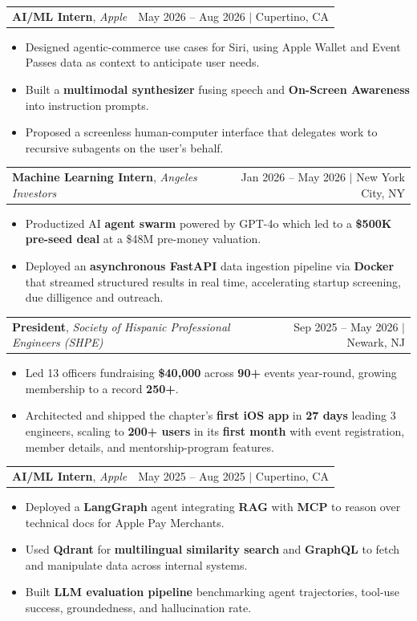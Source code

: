 \documentclass[letterpaper,10pt]{article}
\makeatletter
\newcommand{\resumeItem}[1]{\item\small{{#1}}}
\newcommand{\resumeOneLineHeading}[4]{
  \vspace{1pt}\item
    \begin{tabular*}{0.97\textwidth}[t]{l@{\extracolsep{\fill}}r}
      \textbf{#1}, \textit{#2} & \small #3 $|$ #4 \\
    \end{tabular*}\vspace{-3pt}
}
\newcommand{\resumeItemListStart}{
  \begin{itemize}[leftmargin=0.25in]
}
\newcommand{\resumeItemListEnd}{
  \end{itemize}\vspace{-3pt}
}
\makeatother
\begin{document}
    \resumeOneLineHeading
      {AI/ML Intern}
      {Apple}
      {May 2026 -- Aug 2026}
      {Cupertino, CA}

      \vspace{5pt}

      \resumeItemListStart
      \resumeItem{Designed agentic-commerce use cases for Siri, using Apple Wallet and Event Passes data as context to anticipate user needs.}
      \resumeItem{Built a \textbf{multimodal synthesizer} fusing speech and \textbf{On-Screen Awareness} into instruction prompts.}
      \resumeItem{Proposed a screenless human-computer interface that delegates work to recursive subagents on the user's behalf.}
      \resumeItemListEnd


    \resumeOneLineHeading
      {Machine Learning Intern}
      {Angeles Investors}
      {Jan 2026 -- May 2026}
      {New York City, NY}

      \vspace{5pt}


      \resumeItemListStart
        \resumeItem{Productized AI \textbf{agent swarm} powered by GPT-4o which led to a \textbf{\$500K pre-seed deal} at a \$48M pre-money valuation.}
        \resumeItem{Deployed an \textbf{asynchronous FastAPI} data ingestion pipeline via \textbf{Docker} that streamed structured results in real time, accelerating startup screening, due dilligence and outreach.}
      \resumeItemListEnd
  



    \resumeOneLineHeading
      {President}
      {Society of Hispanic Professional Engineers (SHPE)}
      {Sep 2025 -- May 2026 }
      {Newark, NJ}

      \vspace{5pt}

      \resumeItemListStart
        \resumeItem{Led 13 officers fundraising \textbf{\$40,000} across \textbf{90+} events year-round, growing membership to a record \textbf{250+}.}
        \resumeItem{Architected and shipped the chapter's \textbf{first iOS app} in \textbf{27 days} leading 3 engineers, scaling to \textbf{200+ users} in its \textbf{first month} with event registration, member details, and mentorship-program features.}
      \resumeItemListEnd

    \resumeOneLineHeading
      {AI/ML Intern}
      {Apple}
      {May 2025 -- Aug 2025}
      {Cupertino, CA}

      \vspace{5pt}

      \resumeItemListStart
        \resumeItem{Deployed a \textbf{LangGraph} agent integrating \textbf{RAG} with \textbf{MCP} to reason over technical docs for Apple Pay Merchants.}
        \resumeItem{Used \textbf{Qdrant} for \textbf{multilingual similarity search} and \textbf{GraphQL} to fetch and manipulate data across internal systems.}
        \resumeItem{Built \textbf{LLM evaluation pipeline} benchmarking agent trajectories, tool-use success, groundedness, and hallucination rate.}
      \resumeItemListEnd
\end{document}
